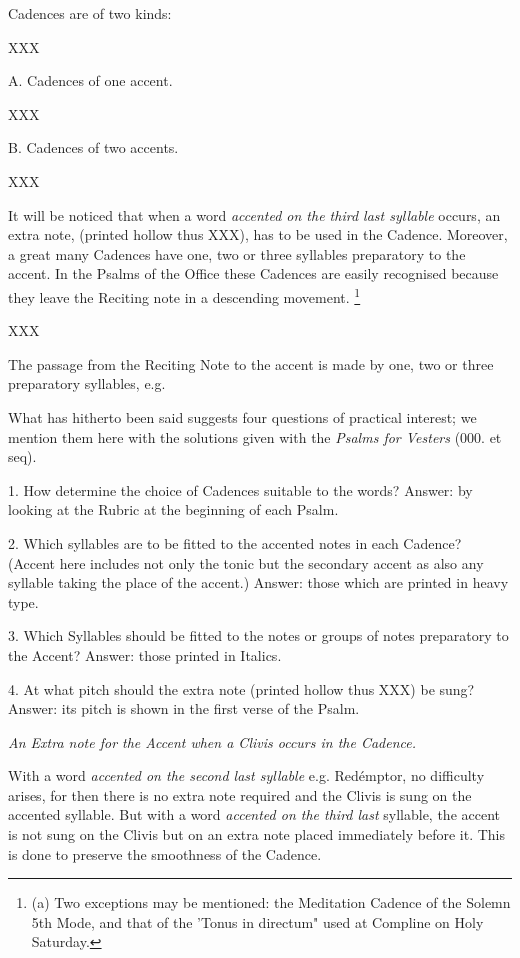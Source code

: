 Cadences are of two kinds:

XXX

A. Cadences of one accent.

XXX

B. Cadences of two accents.

XXX

It will be noticed that when a word {\it accented on the third last syllable} occurs, an extra note, (printed hollow thus XXX), has to be used in the Cadence. Moreover, a great many Cadences have one, two or three syllables preparatory to the accent. In the Psalms of the Office these Cadences are easily recognised because they leave the Reciting note in a descending movement. \footnote{(a) Two exceptions may be mentioned: the Meditation Cadence of the Solemn 5th Mode, and that of the 'Tonus in directum" used at Compline on Holy Saturday.}

XXX

The passage from the Reciting Note to the accent is made by one, two or three preparatory syllables, e.g.

What has hitherto been said suggests four questions of practical interest; we mention them here with the solutions given with the {\it Psalms for Vesters} (000. et seq).

1. How determine the choice of Cadences suitable to the words?
Answer: by looking at the Rubric at the beginning of each Psalm.

2. Which syllables are to be fitted to the accented notes in each Cadence?
(Accent here includes not only the tonic but the secondary accent as also any syllable taking the place of the accent.)
Answer: those which are printed in heavy type.

3. Which Syllables should be fitted to the notes or groups of notes preparatory to the Accent?
Answer: those printed in Italics.

4. At what pitch should the extra note (printed hollow thus XXX) be sung?
Answer: its pitch is shown in the first verse of the Psalm.

\begin{center}
{\it An Extra note for the Accent when a Clivis occurs in the Cadence.}
\end{center}

With a word {\it accented on the second last syllable} e.g. Redémptor, no difficulty arises, for then there is no extra note required and the Clivis is sung on the accented syllable. But with a word {\it accented on the third last} syllable, the accent is not sung on the Clivis but on an extra note placed immediately before it. This is done to preserve the smoothness of the Cadence.

